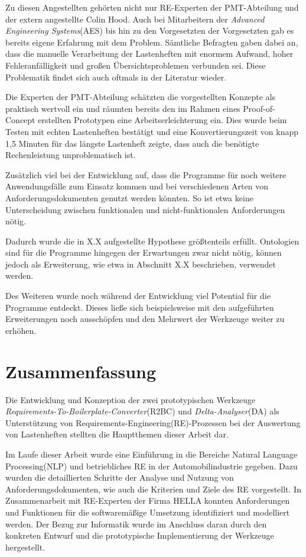 \documentclass[12pt]{report}
\begin{document}
Zu diesen Angestellten gehörten nicht nur RE-Experten der PMT-Abteilung und der extern angestellte Colin Hood. Auch bei Mitarbeitern der \textit{Advanced Engineering Systems}(AES) bis hin zu den Vorgesetzten der Vorgesetzten gab es bereits eigene Erfahrung mit dem Problem. Sämtliche Befragten gaben dabei an, dass die manuelle Verarbeitung der Lastenheften mit enormem Aufwand, hoher Fehleranfälligkeit und großen Übersichtsproblemen verbunden sei. Diese Problematik findet sich auch oftmals in der Literatur wieder\cite{he13}\cite{mw02}.

Die Experten der PMT-Abteilung schätzten die vorgestellten Konzepte als praktisch wertvoll ein und räumten bereits den im Rahmen eines Proof-of-Concept erstellten Prototypen eine Arbeitserleichterung ein. Dies wurde beim Testen mit echten Lastenheften bestätigt und eine Konvertierungszeit von knapp 1,5 Minuten für das längste Lastenheft zeigte, dass auch die benötigte Rechenleistung unproblematisch ist. 

Zusätzlich viel bei der Entwicklung auf, dass die Programme für noch weitere Anwendungsfälle zum Einsatz kommen und bei verschiedenen Arten von Anforderungsdokumenten genutzt werden könnten. So ist etwa keine Unterscheidung zwischen funktionalen und nicht-funktionalen Anforderungen nötig. 

Dadurch wurde die in X.X aufgestellte Hypothese größtenteils erfüllt. Ontologien sind für die Programme hingegen der Erwartungen zwar nicht nötig, können jedoch als Erweiterung, wie etwa in Abschnitt X.X beschrieben, verwendet werden. 

Des Weiteren wurde noch während der Entwicklung viel Potential für die Programme entdeckt. Dieses ließe sich beispielsweise mit den aufgeführten Erweiterungen noch ausschöpfen und den Mehrwert der Werkzeuge weiter zu erhöhen. 


\section{Zusammenfassung}
Die Entwicklung und Konzeption der zwei prototypischen Werkzeuge \textit{Requirements-To-Boilerplate-Converter}(R2BC) und \textit{Delta-Analyser}(DA) als Unterstützung von Requirements-Engineering(RE)-Prozessen bei der Auswertung von Lastenheften stellten die Hauptthemen dieser Arbeit dar.

Im Laufe dieser Arbeit wurde eine Einführung in die Bereiche Natural Language Processing(NLP) und betriebliches RE in der Automobilindustrie gegeben. Dazu wurden die detaillierten Schritte der Analyse und Nutzung von Anforderungsdokumenten, wie auch die Kriterien und Ziele des RE vorgestellt. In Zusammenarbeit mit RE-Experten der Firma HELLA konnten Anforderungen und Funktionen für die softwaremäßige Umsetzung identifiziert und modelliert werden. Der Bezug zur Informatik wurde im Anschluss daran durch den konkreten Entwurf und die prototypische Implementierung der Werkzeuge hergestellt. 
\end{document}

